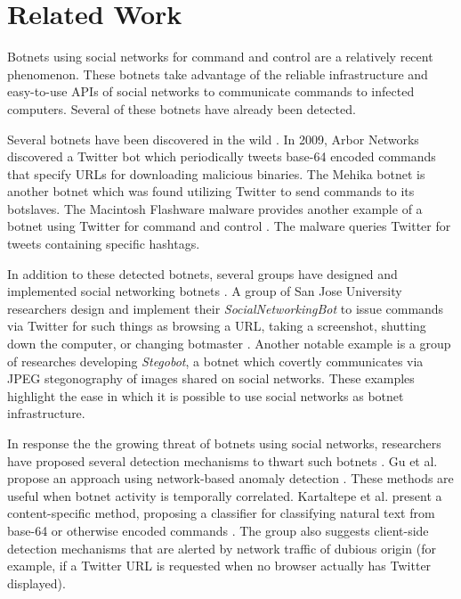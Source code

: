 \documentclass[11pt, oneside]{article} %
\numberwithin{equation}{section} %
\numberwithin{figure}{section} %
\numberwithin{table}{section} %
\begin{document}
\section {Related Work}
Botnets using social networks for command and control are a relatively recent phenomenon. These botnets take advantage of the reliable infrastructure and easy-to-use APIs of social networks to communicate commands to infected computers. Several of these botnets have already been detected. 

Several botnets have been discovered in the wild \cite{arbor, trendmicro, flashback}. In 2009, Arbor Networks \cite{arbor} discovered a Twitter bot which periodically tweets base-64 encoded commands that specify URLs for downloading malicious binaries. The Mehika botnet \cite{trendmicro} is another botnet which was found utilizing Twitter to send commands to its botslaves. The Macintosh Flashware malware provides another example of a botnet using Twitter for command and control \cite{flashback}. The malware queries Twitter for tweets containing specific hashtags. 

In addition to these detected botnets, several groups have designed and implemented social networking botnets \cite{socialnetworking, trojan7, stegobot}. A group of San Jose University researchers design and implement their \emph{SocialNetworkingBot} to issue commands via Twitter for such things as browsing a URL, taking a screenshot, shutting down the computer, or changing botmaster \cite{socialnetworking}. Another notable example is a group of researches developing \emph{Stegobot}, a botnet which covertly communicates via JPEG stegonography of images shared on social networks. These examples highlight the ease in which it is possible to use social networks as botnet infrastructure.

In response the the growing threat of botnets using social networks, researchers have proposed several detection mechanisms to thwart such botnets \cite{botsniffer, kartaltepe, burghouwt}. Gu et al. propose an approach using network-based anomaly detection \cite{botsniffer}. These methods are useful when botnet activity is temporally correlated. Kartaltepe et al. present a content-specific method, proposing a classifier for classifying natural text from base-64 or otherwise encoded commands \cite{kartaltepe}. The group also suggests client-side detection mechanisms that are alerted by network traffic of dubious origin (for example, if a Twitter URL is requested when no browser actually has Twitter displayed).
\end{document}
